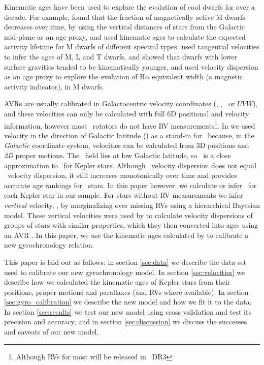 Kinematic ages have been used to explore the evolution of cool dwarfs for over
a decade.
For example, \citet{west2004, west2006} found that the fraction of
magnetically active M dwarfs decreases over time, by using the vertical
distances of stars from the Galactic mid-plane as an age proxy, and
\citet{west2008} used kinematic ages to calculate the expected activity
lifetime for M dwarfs of different spectral types.
\citet{faherty2009} used tangential velocities to infer the ages of M, L and T
dwarfs, and showed that dwarfs with lower surface gravities tended to be
kinematically younger, and \citet{kiman2019} used velocity dispersion as an
age proxy to explore the evolution of H$\alpha$ equivalent width (a magnetic
activity indicator), in M dwarfs.

AVRs are usually calibrated in Galactocentric velocity coordinates (\vx, \vy,
\vz\ or $UVW$), and these velocities can only be calculated with full 6D
positional and velocity information, however most \kepler\ rotators do not
have RV measurements\footnote{Although RVs for most will be released in \gaia\
DR3}.
In \citep{angus2020} we used velocity in the direction of Galactic latitude
(\vb) as a stand-in for \vz\ because, in the {\it Galactic} coordinate system,
velocities can be calculated from 3D positions and {\it 2D} proper motions.
The \kepler\ field lies at low Galactic latitude, so \vb\ is a close
approximation to \vz\ for Kepler stars.
Although \vb\ velocity dispersion does not equal \vz\ velocity dispersion, it
still increases monotonically over time and provides accurate age rankings for
\kepler\ stars.
In this paper however, we calculate or infer \vz\ for each Kepler star in our
sample.
For stars without RV measurements we infer {\it vertical} velocity, \vz, by
marginalizing over missing RVs using a hierarchical Bayesian model.
These vertical velocities were used by \citet{lu2020} to calculate velocity
dispersions of groups of stars with similar properties, which they then
converted into ages using an AVR \citep{yu2018}.
In this paper, we use the kinematic ages calculated by \citet{lu2020} to
calibrate a new gyrochronology relation.

This paper is laid out as follows: in section \ref{sec:data} we describe the
data set used to calibrate our new gyrochronology model.
In section \ref{sec:velocities} we describe how we calculated the kinematic
ages of Kepler stars from their positions, proper motions and parallaxes (and
RVs where available).
In section \ref{sec:gyro_calibration} we describe the new model and how we fit
it to the data.
In section \ref{sec:results} we test our new model using cross validation and
test its precision and accuracy, and in section \ref{sec:discussion} we
discuss the successes and caveats of our new model.
